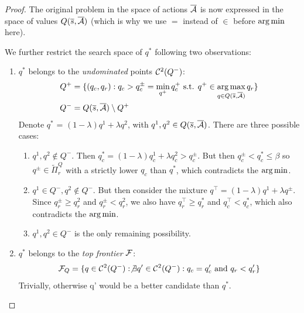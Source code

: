 \begin{proof}
The original problem in the space of actions $\overline{\mathcal{A}}$ is now expressed in the space of values $Q(\overline{s}, \overline{\mathcal{A}})$ (which is why we use $=$ instead of $\in$ before $\operatorname*{arg\,min}$ here).

We further restrict the search space of $q^*$ following two observations:
\begin{enumerate}
    \item $q^*$ belongs to the \emph{undominated} points $\mathcal{C}^2(Q^-)$:
    \begin{align}
        \label{eq:q_minus_undominated}
        Q^+ &= \{(q_c, q_r): q_c > q_c^{\pm} = \min_{q^+} q_c^+\text{ s.t. }q^+\in\operatorname*{arg\,max}_{q\in Q(\overline{s},\overline{\mathcal{A}})} q_r\}\\
        Q^- &= Q(\overline{s},\overline{\mathcal{A}}) \setminus Q^+
    \end{align}
    Denote $q^*$ = $(1-\lambda) q^1 + \lambda q^2$, with $q^1, q^2\in Q(\overline{s},\overline{\mathcal{A}})$. There are three possible cases:
    \begin{enumerate}
        \item $q^1, q^2 \not\in Q^-$. Then $q_c^* = (1-\lambda) q^1_c + \lambda q^2_c > q_c^{\pm}$. But then $q_c^{\pm} < q_c^* \leq \beta$ so $q^{\pm}\in\tilde{\Pi}^Q_r$ with a strictly lower $q_c$ than $q^*$, which contradicts the $\operatorname*{arg\,min}$.
        \item $q^1\in Q^-, q^2 \not\in Q^-$. But then consider the mixture $q^\top = (1-\lambda) q^1 + \lambda q^\pm$. Since $q_r^{\pm} \geq q_r^{2}$ and $q_r^{\pm} < q_r^{2}$, we also have $q^\top_r \geq q_r^*$ and $q^\top_c < q_c^*$, which also contradicts the $\operatorname*{arg\,min}$.
        \item $q^1,q^2\in Q^-$ is the only remaining possibility.
    \end{enumerate}
    \item $q^*$ belongs to the \emph{top frontier} $\mathcal{F}$:
    \begin{equation}
    \label{eq:top-frontier}
        \mathcal{F}_Q = \{q\in \mathcal{C}^2(Q^-): \not\exists q'\in \mathcal{C}^2(Q^-): q_c=q_c'\text{ and }q_r<q_r'\}
    \end{equation}
    Trivially, otherwise q' would be a better candidate than $q^*$.
\end{enumerate}



\end{proof}
